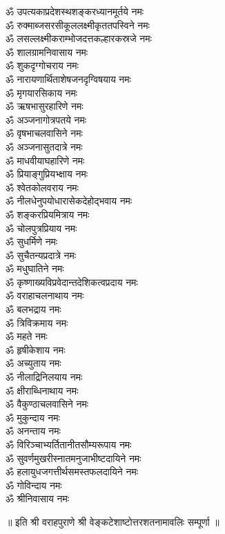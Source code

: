 \begin{multicols}{2}
\begin{flushleft}
ॐ उपत्यकाप्रदेशस्थशङ्करध्यानमूर्तये नमः\\
ॐ रुक्माब्जसरसीकूललक्ष्मीकृततपस्विने नमः\\
ॐ लसल्लक्ष्मीकराम्भोजदत्तकल्हारकस्रजे नमः\\
ॐ शालग्रामनिवासाय नमः\\
ॐ शुकदृग्गोचराय नमः\\
ॐ नारायणार्थिताशेषजनदृग्विषयाय नमः\\
ॐ मृगयारसिकाय नमः\\
ॐ ऋषभासुरहारिणे नमः\hfill{}\\
ॐ अञ्जनागोत्रपतये नमः\\
ॐ वृषभाचलवासिने नमः\\
ॐ अञ्जनासुतदात्रे नमः\\
ॐ माधवीयाघहारिणे नमः\\
ॐ प्रियाङ्गुप्रियभ्क्षाय नमः\\
ॐ श्वेतकोलवराय नमः\\
ॐ नीलधेनुपयोधारासेकदेहोद्भवाय नमः\\
ॐ शङ्करप्रियमित्राय नमः\\
ॐ चोलपुत्रप्रियाय नमः\\
ॐ सुधर्मिणे नमः\hfill{}\\
ॐ सुचैतन्यप्रदात्रे नमः\\
ॐ मधुघातिने नमः\\
ॐ कृष्णाख्यविप्रवेदान्तदेशिकत्वप्रदाय नमः\\
ॐ वराहाचलनाथाय नमः\\
ॐ बलभद्राय नमः\\
ॐ त्रिविक्रमाय नमः\\
ॐ महते नमः\\
ॐ हृषीकेशाय नमः\\
ॐ अच्युताय नमः\\
ॐ नीलाद्रिनिलयाय नमः\hfill{}\\
ॐ क्षीराब्धिनाथाय नमः\\
ॐ वैकुण्ठाचलवासिने नमः\\
ॐ मुकुन्दाय नमः\\
ॐ अनन्ताय नमः\\
ॐ विरिञ्चाभ्यर्तितानीतसौम्यरूपाय नमः\\
ॐ सुवर्णमुखरीस्नातमनुजाभीष्टदायिने नमः\\
ॐ हलायुधजगत्तीर्थसमस्तफलदायिने नमः\\
ॐ गोविन्दाय नमः\\
ॐ श्रीनिवासाय नमः\\
\end{flushleft}
\end{multicols}
\centerline{॥ इति श्री वराहपुराणे श्री वेङ्कटेशाष्टोत्तरशतनामावलिः सम्पूर्णा ॥}
